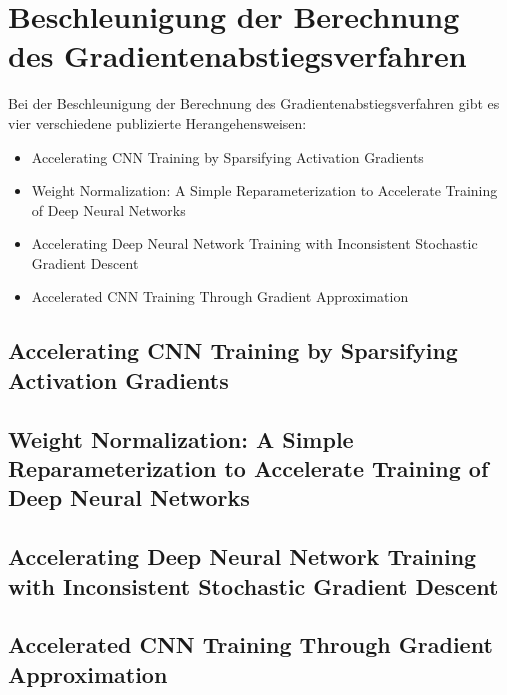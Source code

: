 \section{Beschleunigung der Berechnung des Gradientenabstiegsverfahren}
Bei der Beschleunigung der Berechnung des Gradientenabstiegsverfahren gibt es vier verschiedene publizierte Herangehensweisen:
\begin{itemize}
 \item Accelerating CNN Training by Sparsifying Activation Gradients
 \item Weight Normalization: A Simple Reparameterization
to Accelerate Training of Deep Neural Networks
 \item Accelerating Deep Neural Network Training with Inconsistent Stochastic Gradient Descent
 \item Accelerated CNN Training Through Gradient Approximation 
\end{itemize}


\subsection{Accelerating CNN Training by Sparsifying Activation Gradients}

\subsection{Weight Normalization: A Simple Reparameterization
to Accelerate Training of Deep Neural Networks}




\subsection{Accelerating Deep Neural Network Training with Inconsistent Stochastic Gradient Descent}



\subsection{Accelerated CNN Training Through Gradient Approximation }


